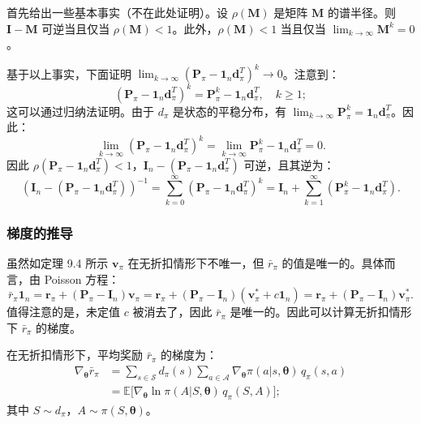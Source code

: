 \documentclass[UTF8]{article}
\begin{document}
\begin{proofbox}
首先给出一些基本事实（不在此处证明）。设 $\rho(\boldsymbol{M})$ 是矩阵 $\boldsymbol{M}$ 的谱半径。则 $\boldsymbol{I} - \boldsymbol{M}$ 可逆当且仅当 $\rho(\boldsymbol{M}) < 1$。此外，$\rho(\boldsymbol{M}) < 1$ 当且仅当 $\lim_{k \to \infty} \boldsymbol{M}^k = 0$。

基于以上事实，下面证明 $\lim_{k \to \infty} (\boldsymbol{P}_\pi - \boldsymbol{1}_n \boldsymbol{d}_\pi^T)^k \to 0$。注意到：
\[
(\boldsymbol{P}_\pi - \boldsymbol{1}_n \boldsymbol{d}_\pi^T)^k = \boldsymbol{P}_\pi^k - \boldsymbol{1}_n \boldsymbol{d}_\pi^T, \quad k \geq 1;
\]
这可以通过归纳法证明。由于 $d_\pi$ 是状态的平稳分布，有 $\lim_{k \to \infty} \boldsymbol{P}_\pi^k = \boldsymbol{1}_n \boldsymbol{d}_\pi^T$。因此：
\[
\lim_{k \to \infty} (\boldsymbol{P}_\pi - \boldsymbol{1}_n \boldsymbol{d}_\pi^T)^k = \lim_{k \to \infty} \boldsymbol{P}_\pi^k - \boldsymbol{1}_n \boldsymbol{d}_\pi^T = 0.
\]
因此 $\rho(\boldsymbol{P}_\pi - \boldsymbol{1}_n \boldsymbol{d}_\pi^T) < 1$，$\boldsymbol{I}_n - (\boldsymbol{P}_\pi - \boldsymbol{1}_n \boldsymbol{d}_\pi^T)$ 可逆，且其逆为：
\[
(\boldsymbol{I}_n - (\boldsymbol{P}_\pi - \boldsymbol{1}_n \boldsymbol{d}_\pi^T))^{-1} = \sum_{k=0}^{\infty} (\boldsymbol{P}_\pi - \boldsymbol{1}_n \boldsymbol{d}_\pi^T)^k
= \boldsymbol{I}_n + \sum_{k=1}^{\infty} (\boldsymbol{P}_\pi^k - \boldsymbol{1}_n \boldsymbol{d}_\pi^T).
\]
\end{proofbox}

\subsubsection*{梯度的推导}

虽然如定理 9.4 所示 $\boldsymbol{v}_\pi$ 在无折扣情形下不唯一，但 $\bar{r}_\pi$ 的值是唯一的。具体而言，由 Poisson 方程：
\[
\bar{r}_\pi \boldsymbol{1}_n = \boldsymbol{r}_\pi + (\boldsymbol{P}_\pi - \boldsymbol{I}_n) \boldsymbol{v}_\pi
= \boldsymbol{r}_\pi + (\boldsymbol{P}_\pi - \boldsymbol{I}_n)(\boldsymbol{v}_\pi^* + c \boldsymbol{1}_n)
= \boldsymbol{r}_\pi + (\boldsymbol{P}_\pi - \boldsymbol{I}_n) \boldsymbol{v}_\pi^*.
\]
值得注意的是，未定值 $c$ 被消去了，因此 $\bar{r}_\pi$ 是唯一的。因此可以计算无折扣情形下 $\bar{r}_\pi$ 的梯度。

\begin{theorembox}
    在无折扣情形下，平均奖励 $\bar{r}_\pi$ 的梯度为：
    \begin{align*}
    \nabla_{\boldsymbol{\theta}} \bar{r}_\pi &= \sum_{s \in \mathcal{S}} d_\pi(s) \sum_{a \in \mathcal{A}} \nabla_{\boldsymbol{\theta}} \pi(a|s, \boldsymbol{\theta}) \, q_\pi(s,a) \\
    &= \mathbb{E}\bigl[ \nabla_{\boldsymbol{\theta}} \ln \pi(A|S, \boldsymbol{\theta}) \, q_\pi(S, A) \bigr];
    \end{align*}
    其中 $S \sim d_\pi$，$A \sim \pi(S, \boldsymbol{\theta})$。
\end{theorembox}
\end{document}
